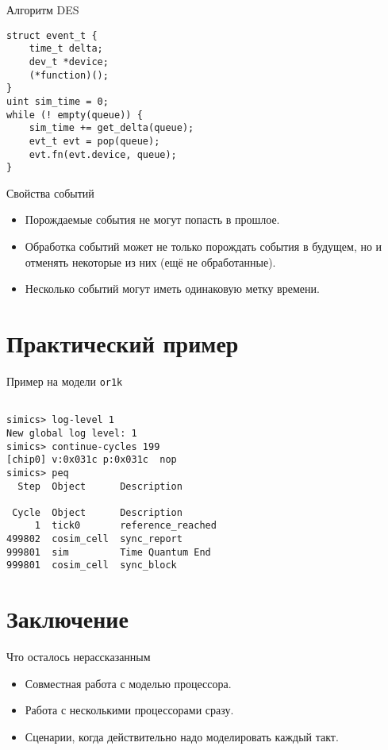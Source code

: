 \documentclass{beamer}
\begin{document}
\begin{frame}[fragile]{Алгоритм DES}

\begin{verbatim}
struct event_t {
    time_t delta;
    dev_t *device;
    (*function)();
}
uint sim_time = 0;
while (! empty(queue)) {
    sim_time += get_delta(queue);
    evt_t evt = pop(queue);
    evt.fn(evt.device, queue);
}
\end{verbatim}

\end{frame}

\begin{frame}{Свойства событий}

\begin{itemize}
\item Порождаемые события не могут попасть в прошлое.
\item Обработка событий может не только порождать события в будущем, но и отменять некоторые из них (ещё не обработанные).
\item Несколько событий могут иметь одинаковую метку времени.
\end{itemize}

\end{frame}


\section{Практический пример}

\begin{frame}[fragile]{Пример на модели \texttt{or1k}}
\begin{verbatim}

simics> log-level 1
New global log level: 1
simics> continue-cycles 199
[chip0] v:0x031c p:0x031c  nop
simics> peq
  Step  Object      Description

 Cycle  Object      Description
     1  tick0       reference_reached
499802  cosim_cell  sync_report
999801  sim         Time Quantum End
999801  cosim_cell  sync_block
\end{verbatim}

    
\end{frame}

\section{Заключение}
\begin{frame}{Что осталось нерассказанным}
\begin{itemize}
    \item Совместная работа с моделью процессора.
    \item Работа с несколькими процессорами сразу.
    \item Сценарии, когда действительно надо моделировать каждый такт.
\end{itemize}
\end{frame}
\end{document}
